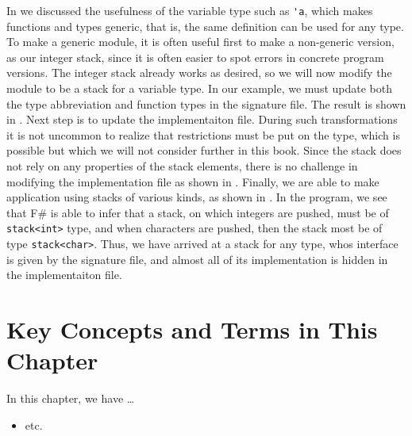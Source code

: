 \documentclass[fsharpNotes.tex]{subfiles}
\begin{document}
In  we discussed the usefulness of the variable type such as \lstinline{'a}, which makes functions and types generic, that is, the same definition can be used for any type. To make a generic module, it is often useful first to make a non-generic version, as our integer stack, since it is often easier to spot errors in concrete program versions. The integer stack already works as desired, so we will now modify the module to be a stack for a variable type. In our example, we must update both the type abbreviation and function types in the signature file. The result is shown in .
Next step is to update the implementaiton file. During such transformations it is not uncommon to realize that restrictions must be put on the type, which is possible but which we will not consider further in this book. Since the stack does not rely on any properties of the stack elements, there is no challenge in modifying the implementation file as shown in .
Finally, we are able to make application using stacks of various kinds, as shown in .
In the program, we see that F\# is able to infer that a stack, on which integers are pushed, must be of \lstinline{stack<int>} type, and when characters are pushed, then the stack most be of type \lstinline{stack<char>}. Thus, we have arrived at a stack for any type, whos interface is given by the signature file, and almost all of its implementation is hidden in the implementaiton file.

\section{Key Concepts and Terms in This Chapter}
In this chapter, we have \dots
\begin{itemize}
\item etc.
\end{itemize}
\end{document}

